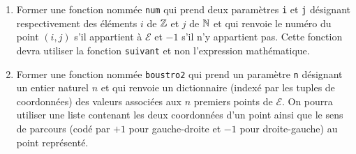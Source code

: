 \begin{enumerate}
\begin{enumerate}
  \item Former une fonction nommée \verb|num| qui prend deux paramètres \verb|i| et \verb|j| désignant respectivement des éléments $i$ de $\mathbb{Z}$ et  $j$ de $\mathbb{N}$ et qui renvoie le numéro du point $(i,j)$ s'il appartient à $\mathcal{E}$ et $-1$ s'il n'y appartient pas. Cette fonction devra utiliser la fonction \verb|suivant| et non l'expression mathématique.
  \item Former une fonction nommée \verb|boustro2| qui prend un paramètre \verb|n| désignant un entier naturel $n$ et qui renvoie un dictionnaire (indexé par les tuples de coordonnées) des valeurs associées aux $n$ premiers points de $\mathcal{E}$. On pourra utiliser une liste contenant les deux coordonnées d'un point ainsi que le sens de parcours (codé par $+1$ pour gauche-droite et $-1$ pour droite-gauche) au point représenté. 
\end{enumerate}

\end{enumerate}
